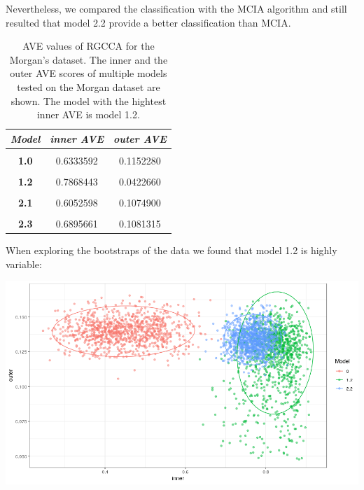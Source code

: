 \documentclass[
  12pt,
  a4paper,
  twoside,
  openright]{book}
\let\origfigure\figure
\let\endorigfigure\endfigure
\renewenvironment{figure}[1][2] {
    \expandafter\origfigure\expandafter[!htp]
} {
    \endorigfigure
}
\begin{document}
Nevertheless, we compared the classification with the MCIA algorithm and still resulted that model 2.2 provide a better classification than MCIA.

\begin{table}[H]

\caption[AVE values of RGCCA for the Morgan's dataset.]{\label{tab:morgan-models-ave}AVE values of RGCCA for the Morgan's dataset. The inner and the outer AVE scores of multiple models tested on the Morgan dataset are shown. The model with the hightest inner AVE is model 1.2.}
\centering
\begin{tabular}[t]{|>{}c|c|>{}c|}
\hline
\em{\textbf{Model}} & \em{\textbf{inner AVE}} & \em{\textbf{outer AVE}}\\
\hline
\textbf{\cellcolor{gray!6}{0.0}} & \cellcolor{gray!6}{0.4735601} & \cellcolor{gray!6}{0.1098639}\\
\hline
\textbf{1.0} & 0.6333592 & 0.1152280\\
\hline
\textbf{\cellcolor{gray!6}{1.1}} & \cellcolor{gray!6}{0.2448234} & \cellcolor{gray!6}{0.1104746}\\
\hline
\textbf{1.2} & 0.7868443 & 0.0422660\\
\hline
\textbf{\cellcolor{gray!6}{2.0}} & \cellcolor{gray!6}{0.4404123} & \cellcolor{gray!6}{0.1088730}\\
\hline
\textbf{2.1} & 0.6052598 & 0.1074900\\
\hline
\textbf{\cellcolor{gray!6}{2.2}} & \cellcolor{gray!6}{0.6895661} & \cellcolor{gray!6}{0.1081315}\\
\hline
\textbf{2.3} & 0.6895661 & 0.1081315\\
\hline
\end{tabular}
\end{table}

When exploring the bootstraps of the data we found that model 1.2 is highly variable:

\begin{figure}
\includegraphics[width=1\linewidth]{images/morgan_bootstrap} \caption[AVE scores of bootstrapped models on Morgans' dataset.]{Inner and outer AVE scores of the bootstrapped models 0 1.2 and 2.2. Model 0 does not have sample data. Model 1.2 has microbiome, transcriptonme and sample data in a single block and model 2.2 has microbiome, transcriptome and the sample data split in several blocks.}\label{fig:morgan-bootstrap}
\end{figure}
\end{document}
